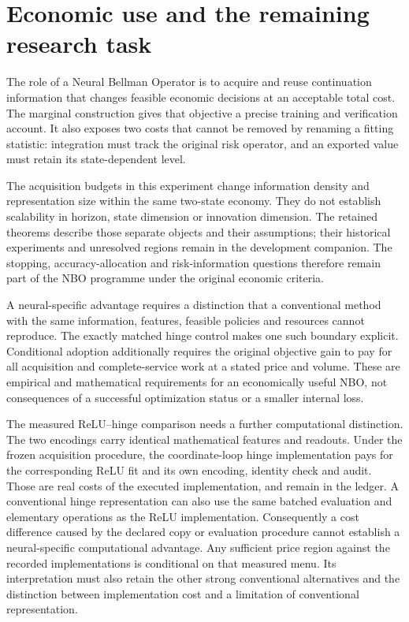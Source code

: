\section{Economic use and the remaining research task}
\label{sec:discussion121}

The role of a Neural Bellman Operator is to acquire and reuse continuation
information that changes feasible economic decisions at an acceptable total
cost. The marginal construction gives that objective a precise training and
verification account. It also exposes two costs that cannot be removed by
renaming a fitting statistic: integration must track the original risk
operator, and an exported value must retain its state-dependent level.

The acquisition budgets in this experiment change information density and
representation size within the same two-state economy. They do not establish
scalability in horizon, state dimension or innovation dimension. The retained
theorems describe those separate objects and their assumptions; their
historical experiments and unresolved regions remain in the development
companion. The stopping, accuracy-allocation and risk-information questions
therefore remain part of the NBO programme under the original economic
criteria.

A neural-specific advantage requires a distinction that a conventional
method with the same information, features, feasible policies and resources
cannot reproduce. The exactly matched hinge control makes one such boundary
explicit. Conditional adoption additionally requires the original objective
gain to pay for all acquisition and complete-service work at a stated price
and volume. These are empirical and mathematical requirements for an
economically useful NBO, not consequences of a successful optimization status
or a smaller internal loss.

The measured ReLU--hinge comparison needs a further computational distinction.
The two encodings carry identical mathematical features and readouts. Under
the frozen acquisition procedure, the coordinate-loop hinge implementation
pays for the corresponding ReLU fit and its own encoding, identity check and
audit. Those are real costs of the executed implementation, and remain in the
ledger. A conventional hinge representation can also use the same batched
evaluation and elementary operations as the ReLU implementation. Consequently
a cost difference caused by the declared copy or evaluation procedure cannot
establish a neural-specific computational advantage. Any sufficient price
region against the recorded implementations is conditional on that measured
menu. Its interpretation must also retain the other strong conventional
alternatives and the distinction between implementation cost and a limitation
of conventional representation.
